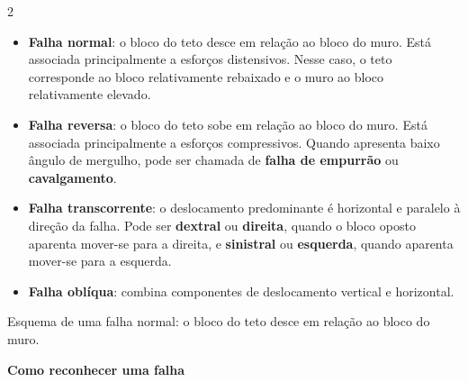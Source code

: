 \documentclass[11pt,a4paper,twoside,openany]{book}
\newenvironment{verbete}[1]{%
  \needspace{6\baselineskip}
  \markboth{#1}{#1}
  \par\addvspace{0.55em}
  \noindent{\sffamily\bfseries\large\color{uerjblue}#1}\par\nobreak
  \vspace{0.15em}
}{%
  \par\addvspace{0.65em}
}
\newcommand{\termo}[1]{\textbf{#1}}
\begin{document}
\begin{multicols*}{2}
\begin{verbete}{Falha}
\begin{itemize}
  \item \termo{Falha normal}: o bloco do teto desce em relação ao bloco do muro. Está associada principalmente a esforços distensivos. Nesse caso, o teto corresponde ao bloco relativamente rebaixado e o muro ao bloco relativamente elevado.
  \item \termo{Falha reversa}: o bloco do teto sobe em relação ao bloco do muro. Está associada principalmente a esforços compressivos. Quando apresenta baixo ângulo de mergulho, pode ser chamada de \termo{falha de empurrão} ou \termo{cavalgamento}.
  \item \termo{Falha transcorrente}: o deslocamento predominante é horizontal e paralelo à direção da falha. Pode ser \termo{dextral} ou \termo{direita}, quando o bloco oposto aparenta mover-se para a direita, e \termo{sinistral} ou \termo{esquerda}, quando aparenta mover-se para a esquerda.
  \item \termo{Falha oblíqua}: combina componentes de deslocamento vertical e horizontal.
\end{itemize}

\begin{center}

{\scriptsize Esquema de uma falha normal: o bloco do teto desce em relação ao bloco do muro.}
\end{center}

\textbf{Como reconhecer uma falha}


\end{verbete}
\end{multicols*}
\end{document}
